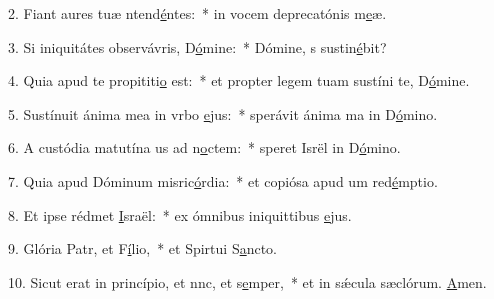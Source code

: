 2. Fiant aures tuæ ntend\uline{é}ntes:~* in vocem deprecatónis m\uline{e}æ.\par 
3. Si iniquitátes observávris, D\uline{ó}mine:~* Dómine, s sustin\uline{é}bit?\par 
4. Quia apud te propititi\uline{o} est:~* et propter legem tuam sustíni te, D\uline{ó}mine.\par 
5. Sustínuit ánima mea in vrbo \uline{e}jus:~* sperávit ánima ma in D\uline{ó}mino.\par 
6. A custódia matutína us ad n\uline{o}ctem:~* speret Isrël in D\uline{ó}mino.\par 
7. Quia apud Dóminum misric\uline{ó}rdia:~* et copiósa apud um red\uline{é}mptio.\par 
8. Et ipse rédmet \uline{I}sraël:~* ex ómnibus iniquittibus \uline{e}jus.\par 
9. Glória Patr, et F\uline{í}lio,~* et Spirtui S\uline{a}ncto.\par 
10. Sicut erat in princípio, et nnc, et s\uline{e}mper,~* et in sǽcula sæclórum. \uline{A}men.\par 
